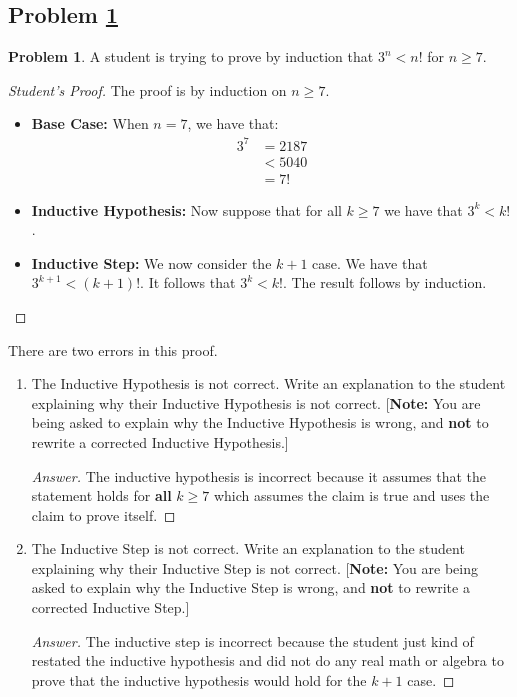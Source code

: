 \documentclass[11pt]{article}
\theoremstyle{definition}
\theoremstyle{definition}
\newtheorem{required}{Problem}
\theoremstyle{definition}
\begin{document}
\subsection{Problem \ref{Induction1}}
\begin{required} \label{Induction1}
A student is trying to prove by induction that $3^{n} < n!$ for $n \geq 7$. 

\begin{proof}[Student's Proof]
The proof is by induction on $n \geq 7$. 
\begin{itemize}
\item \textbf{Base Case:} When $n = 7$, we have that:
\begin{align*}
3^{7} &= 2187 \\
&< 5040 \\
&= 7!
\end{align*}

\item \textbf{Inductive Hypothesis:} Now suppose that for all $k \geq 7$ we have that $3^{k} < k!$. 

\item \textbf{Inductive Step:} We now consider the $k+1$ case. We have that $3^{k+1} < (k+1)!$. It follows that $3^{k} < k!$. The result follows by induction.
\end{itemize}
\end{proof}

There are two errors in this proof. 
\begin{enumerate}[label=(\alph*)]
\item The Inductive Hypothesis is not correct. Write an explanation to the student explaining why their Inductive Hypothesis is not correct.  [\textbf{Note:} You are being asked to explain why the Inductive Hypothesis is wrong, and \textbf{not} to rewrite a corrected Inductive Hypothesis.]


\begin{proof}[Answer]
The inductive hypothesis is incorrect because it assumes that the statement holds for \textbf{all}  $k \geq 7$ which assumes the claim is true and uses the claim to prove itself.
\end{proof}



\vskip 15pt
\item The Inductive Step is not correct. Write an explanation to the student explaining why their Inductive Step is not correct. [\textbf{Note:} You are being asked to explain why the Inductive Step is wrong, and \textbf{not} to rewrite a corrected Inductive Step.]

\begin{proof}[Answer]
The inductive step is incorrect because the student just kind of restated the inductive hypothesis and did not do any real math or algebra to prove that the inductive hypothesis would hold for the $k+1$ case.
\end{proof}
\end{enumerate}
\end{required}
\end{document}
